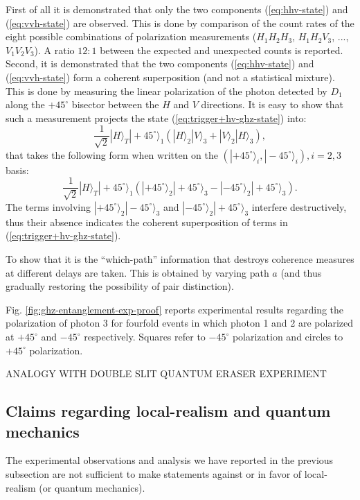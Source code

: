 First of all it is demonstrated that only the two components (\ref{eq:hhv-state}) and (\ref{eq:vvh-state}) are observed. This is done by comparison of the count rates of the eight possible combinations of polarization measurements ($H_1 H_2 H_3$, $H_1 H_2 V_3$, ..., $V_1 V_2 V_3$). A ratio $12:1$ between the expected and unexpected counts is reported. Second, it is demonstrated that the two components (\ref{eq:hhv-state}) and (\ref{eq:vvh-state}) form a coherent superposition (and not a statistical mixture). This is done by measuring the linear polarization of the photon detected by $D_1$ along the $+ 45^\circ$ bisector between the $H$ and $V$ directions. It is easy to show that such a measurement projects the state (\ref{eq:trigger+hv-ghz-state}) into:
\begin{equation*}
    \frac{1}{\sqrt{2}} |H\rangle_T |+ 45^\circ\rangle_1 \left( |H\rangle_2 |V\rangle_3 + |V\rangle_2 |H\rangle_3 \right),
\end{equation*}
that takes the following form when written on the $( |+ 45^\circ\rangle_i, |- 45^\circ\rangle_i), i = 2, 3$ basis:
\begin{equation*}
    \frac{1}{\sqrt{2}} |H\rangle_T |+ 45^\circ\rangle_1 \left( |+ 45^\circ\rangle_2 |+ 45^\circ\rangle_3 - |- 45^\circ\rangle_2 |+ 45^\circ\rangle_3 \right).
\end{equation*}
The terms involving $|+ 45^\circ\rangle_2 |- 45^\circ\rangle_3$ and $|- 45^\circ\rangle_2 |+ 45^\circ\rangle_3$ interfere destructively, thus their absence indicates the coherent superposition of terms in (\ref{eq:trigger+hv-ghz-state}).

To show that it is the ``which-path'' information that destroys coherence measures at different delays are taken. This is obtained by varying path $a$ (and thus gradually restoring the possibility of pair distinction).

Fig. \ref{fig:ghz-entanglement-exp-proof} reports experimental results regarding the polarization of photon 3 for fourfold events in which photon 1 and 2 are polarized at $+ 45^\circ$ and $- 45^\circ$ respectively. Squares refer to $- 45^\circ$ polarization and circles to $+ 45^\circ$ polarization.

\begin{observation}
  ANALOGY WITH DOUBLE SLIT QUANTUM ERASER EXPERIMENT
\end{observation}


\subsection{Claims regarding local-realism and quantum mechanics}
The experimental observations and analysis we have reported in the previous subsection are not sufficient to make statements against or in favor of local-realism (or quantum mechanics).

